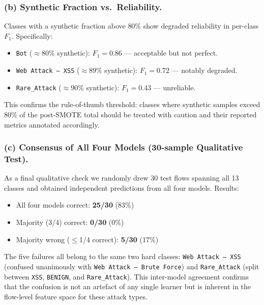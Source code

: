 \subsubsection*{(b) Synthetic Fraction vs.\ Reliability.}
Classes with a synthetic fraction above 80\% show degraded reliability in per-class $F_1$. Specifically:
\begin{itemize}
    \item \texttt{Bot} ($\approx 80\%$ synthetic): $F_1 = 0.86$ --- acceptable but not perfect.
    \item \texttt{Web Attack -- XSS} ($\approx 89\%$ synthetic): $F_1 = 0.72$ --- notably degraded.
    \item \texttt{Rare\_Attack} ($\approx 90\%$ synthetic): $F_1 = 0.43$ --- unreliable.
\end{itemize}
This confirms the rule-of-thumb threshold: classes where synthetic samples exceed 80\% of the post-SMOTE total should be treated with caution and their reported metrics annotated accordingly.

\subsubsection*{(c) Consensus of All Four Models (30-sample Qualitative Test).}
As a final qualitative check we randomly drew 30 test flows spanning all 13 classes and obtained independent predictions from all four models. Results:
\begin{itemize}
    \item All four models correct: \textbf{25/30} (83\%)
    \item Majority (3/4) correct: \textbf{0/30} (0\%)
    \item Majority wrong ($\leq$1/4 correct): \textbf{5/30} (17\%)
\end{itemize}
The five failures all belong to the same two hard classes: \texttt{Web Attack -- XSS} (confused unanimously with \texttt{Web Attack -- Brute Force}) and \texttt{Rare\_Attack} (split between \texttt{XSS}, \texttt{BENIGN}, and \texttt{Rare\_Attack}). This inter-model agreement confirms that the confusion is not an artefact of any single learner but is inherent in the flow-level feature space for these attack types.
